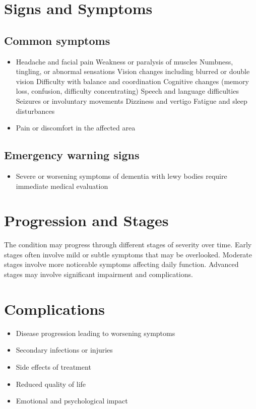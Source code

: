 \section{Signs and Symptoms}
\subsection{Common symptoms}
\begin{itemize}[noitemsep]
  \item Headache and facial pain Weakness or paralysis of muscles Numbness, tingling, or abnormal sensations Vision changes including blurred or double vision Difficulty with balance and coordination Cognitive changes (memory loss, confusion, difficulty concentrating) Speech and language difficulties Seizures or involuntary movements Dizziness and vertigo Fatigue and sleep disturbances
  \item Pain or discomfort in the affected area
  \end{itemize}
\subsection{Emergency warning signs}
\begin{itemize}[noitemsep]
  \item Severe or worsening symptoms of dementia with lewy bodies require immediate medical evaluation
\end{itemize}
\section{Progression and Stages}
The condition may progress through different stages of severity over time. Early stages often involve mild or subtle symptoms that may be overlooked. Moderate stages involve more noticeable symptoms affecting daily function. Advanced stages may involve significant impairment and complications.
\section{Complications}
\begin{itemize}[noitemsep]
  \item Disease progression leading to worsening symptoms
  \item Secondary infections or injuries
  \item Side effects of treatment
  \item Reduced quality of life
  \item Emotional and psychological impact
\end{itemize}

